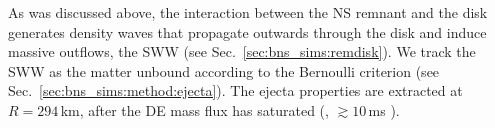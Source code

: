 %    



As was discussed above, the interaction between the \ac{NS} remnant and the disk 
generates density waves that propagate outwards through the disk and induce massive outflows, 
the \ac{SWW} (see Sec.~\ref{sec:bns_sims:remdisk}).
%
We track the \ac{SWW} as the matter unbound according to the Bernoulli criterion 
(see Sec.~\ref{sec:bns_sims:method:ejecta}). 
%
The ejecta properties are extracted at $R=294\,$km, after the \ac{DE} mass 
flux has saturated (\eg, ${\gtrsim}10\,$ms \pmerg{}).
%
%


%

